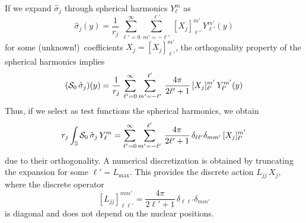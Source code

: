 If we expand $\hat{\sigma}_j$ through spherical harmonics $Y_\ell^m$ as
\[
\hat{\sigma}_j(y) = \frac{1}{r_j} \, \sum_{\ell'= 0}^{\infty} \sum_{m' = -\ell'}^{\ell'} \,  [X_j]_{\ell'}^{m'} \, Y_{\ell'}^{m'}(y)
\]
for some (unknown!)~coefficients $X_j = [X_j]_{\ell'}^{m'}$, the orthogonality property of the spherical harmonics implies
\[
(\mathcal{S}_0 \, \hat{\sigma}_j)(y) = \frac{1}{r_j} \, \sum_{\ell'= 0}^{\infty} \sum_{m' = -\ell'}^{\ell'} \, \frac{4\pi}{2\ell' + 1}\, [X_j]_{\ell'}^{m'} \, Y_{\ell'}^{m'}(y)
\]
Thus, if we select as test functions the spherical harmonics, we obtain
\begin{equation*}%
r_j\int_\mathbb{S} \cS_0 \, \hat{\sigma}_j \, Y_\ell^m = \sum_{\ell'= 0}^{\infty} \sum_{m' = -\ell'}^{\ell'} \, \frac{4\pi}{2\ell' + 1} \, \delta_{\ell \ell'} \delta_{m m'}\, [X_j]_{\ell'}^{m'} 
\end{equation*}
due to their orthogonality. A numerical discretization is obtained by truncating the expansion for some $\ell'=L_\text{max}$. This provides the discrete action $L_{jj} \, X_j$, where the discrete operator
\begin{equation}\label{eq:61}
 [L_{jj}]_{\ell \ell'}^{m m'} =  \frac{4\pi}{2\ell' + 1} \, \delta_{\ell \ell'} \delta_{m m'}
\end{equation}
is diagonal and does not depend on the nuclear positions.

